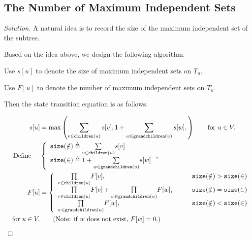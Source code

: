 \documentclass{article}
\newenvironment{solution}{\begin{proof}[\noindent\it Solution]}{\end{proof}}
\begin{document}
\subsection{The Number of Maximum Independent Sets}
\vspace{1em}
\begin{solution}
    A natural idea is to record the size of the maximum independent set of the subtree.
    
    \hspace{2.6em}
    Based on the idea above, we design the following algorithm.
    
    \vspace{1em} \hspace{2.6em}
    Use $s[u]$ to denote the size of maximum independent sets on $T_u$.
    
    \hspace{2.6em}
    Use $F[u]$ to denote the number of maximum independent sets on $T_u$.
    
    \hspace{2.6em}
    Then the state transition equation is as follows.
    
    \vspace{-2em}
    \begin{align*}
        s[u] &= \max\left(\sum_{v\in\mathtt{children}(u)}s[v], 1+\sum_{w\in\mathtt{grandchildren}(u)}s[w],\right) \qquad \text{for }u\in V.\\
        \quad\ \text{Define\quad\ }&\left\{
        \begin{array}{l}
            \mathtt{size}(\notin) \triangleq  \underset{v\in\mathtt{children}(u)}{\sum}s[v]  \\
            \mathtt{size}(\in) \triangleq 1+\underset{w\in\mathtt{grandchildren}(u)}{\sum}s[w]
        \end{array} \right.,\\
        F[u] & = \left\{\begin{array}{ll}
            \underset{v\in\mathtt{children}(u)}{\prod}F[v], &  \qquad\mathtt{size}(\notin)>\mathtt{size}(\in) \\
            \underset{v\in\mathtt{children}(u)}{\prod}F[v]+\underset{w\in\mathtt{grandchildren}(u)}{\prod}F[w], & \qquad\mathtt{size}(\notin)=\mathtt{size}(\in) \\
            \underset{w\in\mathtt{grandchildren}(u)}{\prod}F[w], &  \qquad\mathtt{size}(\notin)<\mathtt{size}(\in) \\
        \end{array}\right. \\
        \text{for }u\in V. &\qquad \text{(Note: if $w$ does not exist, $F[w]=0.$)}
    \end{align*}
    

\end{solution}
\end{document}
